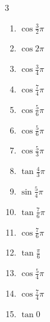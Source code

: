 \begin{multicols}{3}
\begin{enumerate}
  \item $\displaystyle \cos{\frac{3}{2}\pi}$
        \phantom{$\displaystyle =0$}

  \item $\displaystyle \cos{2\pi}$
        \phantom{$\displaystyle =1$}

  \item $\displaystyle \cos{\frac{3}{4}\pi}$

  \item $\displaystyle \cos{\frac{7}{4}\pi}$

\columnbreak %

  \item $\displaystyle \cos{\frac{5}{6}\pi}$

  \item $\displaystyle \cos{\frac{5}{6}\pi}$

  \item $\displaystyle \cos{\frac{5}{3}\pi}$

  \item $\displaystyle \tan{\frac{4}{3}\pi}$

  \item $\displaystyle \sin{\frac{5}{4}\pi}$

  \item $\displaystyle \tan{\frac{7}{6}\pi}$

  \item $\displaystyle \cos{\frac{7}{6}\pi}$

  \item $\displaystyle \tan{\frac{\pi}{6}}$

  \item $\displaystyle \cos{\frac{5}{4}\pi}$

  \item $\displaystyle \cos{\frac{7}{4}\pi}$

  \item $\displaystyle \tan{0}$
        \phantom{$\displaystyle =0$}


\end{enumerate}
\end{multicols}
